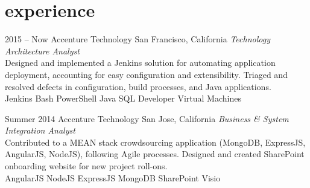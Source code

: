 \documentclass[]{friggeri-cv} %
\begin{document}
\section{experience}

\begin{entrylist}

 
\entry
{2015 -- Now}
{Accenture Technology}
{San Francisco, California}
{\emph{Technology Architecture Analyst} \\
Designed and implemented a Jenkins solution for automating application deployment, accounting for easy configuration and extensibility. Triaged and resolved defects in configuration, build processes, and Java applications.\\
Jenkins \mydot Bash \mydot PowerShell \mydot Java \mydot SQL Developer \mydot Virtual Machines}


\entry
{Summer 2014}
{Accenture Technology}
{San Jose, California}
{\emph{Business \& System Integration Analyst} \\
Contributed to a MEAN stack crowdsourcing application (MongoDB, ExpressJS, AngularJS, NodeJS), following Agile processes. Designed and created SharePoint onboarding website for new project roll-ons.\\
AngularJS \mydot NodeJS \mydot ExpressJS \mydot MongoDB \mydot SharePoint \mydot Visio}
%
%


\end{entrylist}
\end{document}
